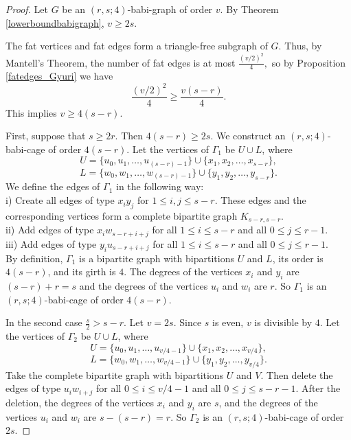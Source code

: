 \documentclass[a4paper,11pt]{article}
\begin{document}
\begin{proof}
Let $G$ be an $(r,s;4)$-babi-graph of order $v.$ 
By Theorem \ref{lowerboundbabigraph}, $v\geq 2s.$ 

The fat vertices and fat edges 
form a triangle-free subgraph of $G$. Thus, by Mantell's Theorem,
the number of fat edges is at most $\frac{(v/2)^2}{4},$ so by Proposition
\ref{fatedges_Gyuri} we have 
$$\frac{(v/2)^2}{4}\geq \frac{v(s-r)}{4}.$$
This implies $v\geq 4(s-r).$


First, suppose that $s \geq 2r$. Then $4(s-r)\geq 2s$. We construct an 
$(r,s;4)$-babi-cage of order $4(s-r)$. Let the vertices of $\Gamma _1$ be $U\cup L$, where 
$$
U=\{ u_0,u_1,\dots ,u_{(s-r)-1}\} \cup \{ x_1,x_2,\dots ,x_{s-r}\}, $$ 
$$L= \{ w_0,w_1,\dots ,w_{(s-r)-1}\}  \cup \{ y_1,y_2,\dots ,y_{s-r}\} .
$$
We define the edges of $\Gamma _1$ in the following way:  \\
i) Create all edges of type $x_iy_j$ for $1\leq i,j\leq s-r$. These edges and the corresponding vertices form a complete bipartite graph $K_{s-r,s-r}$. \\
ii) Add edges of type $x_iw_{s-r+i+j}$ for all $1\leq i\leq s-r $ and all $0\leq j \leq r-1$.  \\
iii) Add edges of type $y_iu_{s-r+i+j}$ for all $1\leq i\leq s-r$ and all $0\leq j \leq r-1$. \\ 
By definition, $\Gamma _1$ is a bipartite graph with bipartitions $U$ and $L$, its order is $4(s-r)$, and its girth is $4$. 
The degrees of the vertices $x_i$ and $y_i$ are $(s-r)+r=s$ and 
the degrees of the vertices $u_i$ and $w_i$ are $r.$ So $\Gamma _1$ is an 
$(r,s;4)$-babi-cage of order $4(s-r)$. 

In the second case $\frac{s}{2}>s-r$. Let $v=2s$. Since $s$ is even, $v$ is divisible by $4.$  Let the vertices of $\Gamma _2$ be $U\cup L$, where 
$$
U=\{ u_0,u_1,\dots ,u_{v/4-1}\} \cup \{ x_1,x_2,\dots ,x_{v/4}\}, $$ 
$$L= \{ w_0,w_1,\dots ,w_{v/4-1}\}  \cup \{ y_1,y_2,\dots ,y_{v/4}\} .
$$
Take the complete bipartite graph with bipartitions $U$ and $V$. Then delete 
the edges of type $u_iw_{i+j}$ for all $0\leq i\leq v/4-1 $ and all $0\leq j \leq s-r-1$. 
After the deletion, the degrees of the vertices $x_i$ and $y_i$ are $s$, and 
the degrees of the vertices $u_i$ and $w_i$ are $s-(s-r)=r.$ So $\Gamma _2$ is an 
$(r,s;4)$-babi-cage of order $2s$. 


\end{proof}
\end{document}
